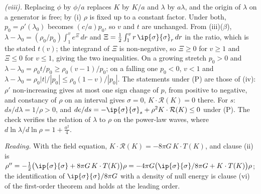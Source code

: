 \emph{(viii).} Replacing $\phi$ by $\phi/a$ replaces $K$ by $K/a$ and $\lambda$ by $a\lambda$, and the origin of $\lambda$ on a generator is free; by (i) $\rho$ is fixed up to a constant factor. Under both, $p_{0} = \rho'(\lambda_{0})$ becomes $(c/a)p_{0}$, so $v$ and $t$ are unchanged. From (iii)($\beta$), $\lambda - \lambda_{0} = (\rho_{0}/p_{0})\int_{1}^{v}e^{\Xi}\,dr$ and $\Xi = \tfrac12\int_{1}^{v}r\,\ip{\sigma}{\sigma}_{r}\,dr$ in the ratio, which is the stated $t(v)$; the integrand of $\Xi$ is non-negative, so $\Xi \geq 0$ for $v \geq 1$ and $\Xi \leq 0$ for $v \leq 1$, giving the two inequalities. On a growing stretch $p_{0} > 0$ and $\lambda - \lambda_{0} = \rho_{0}t/p_{0} \geq \rho_{0}(v - 1)/p_{0}$; on a falling one $p_{0} < 0$, $v < 1$ and $\lambda - \lambda_{0} = \rho_{0}|t|/|p_{0}| \leq \rho_{0}(1 - v)/|p_{0}|$. The statements under (P) are those of (iv): $\rho'$ non-increasing gives at most one sign change of $p$, from positive to negative, and constancy of $\rho$ on an interval gives $\sigma = 0$, $K \cdot \mathcal{R}(K) = 0$ there. For $s$: $ds/d\lambda = 1/\rho > 0$, and $de/ds = -\ip{\sigma}{\sigma}_{s} + \rho^{2}K \cdot \mathcal{R}(K) \leq 0$ under (P). The check verifies the relation of $\lambda$ to $\rho$ on the power-law waves, where $d\ln\lambda/d\ln\rho = 1 + \tfrac{a^{2}}{4}$.

\emph{Reading.} With the field equation, $K \cdot \mathcal{R}(K) = -8\pi G\,K \cdot T(K)$, and clause (ii) is $\rho'' = -\tfrac12\bigl(\ip{\sigma}{\sigma} + 8\pi G\,K \cdot T(K)\bigr)\rho = -4\pi G\bigl(\ip{\sigma}{\sigma}/8\pi G + K \cdot T(K)\bigr)\rho$; the identification of $\ip{\sigma}{\sigma}/8\pi G$ with a density of null energy is clause (vi) of the first-order theorem and holds at the leading order.
